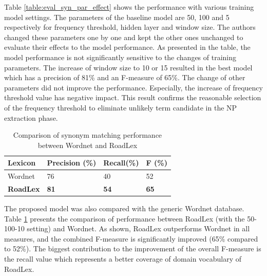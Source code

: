\documentclass[Journal,InsideFigs, DoubleSpace]{ascelike} %
\begin{document}
%
Table \ref{table:eval_syn_par_effect} shows the performance with various training model settings. The parameters of the baseline model are 50, 100 and 5 respectively for frequency threshold, hidden layer and window size. The authors changed these parameters one by one and kept the other ones unchanged to evaluate their effects to the model performance. As presented in the table, the model performance is not significantly sensitive to the changes of training parameters. The increase of window size to 10 or 15 resulted in the best model which has a precision of 81\% and an F-measure of 65\%. The change of other parameters did not improve the performance. Especially, the increase of frequency threshold value has negative impact. This result confirms the reasonable selection of the frequency threshold to eliminate unlikely term candidate in the NP extraction phase.
%
\begin{table} [b] 
	\caption{Comparison of synonym matching performance between Wordnet and RoadLex}
	\label{table:eval_syn_vs_Wordnet}
	\centering
	\small
	\renewcommand{\arraystretch}{1.25}
	\begin{tabular}{l l l l }
		\hline
		\hline
		\textbf{Lexicon} & \textbf{Precision (\%)}  & \textbf{Recall(\%)} & \textbf{F (\%)}\\
		\hline
		Wordnet	&76 	&40 	&52\\	
		\textbf{RoadLex} &\textbf{81}	&\textbf{54}		&\textbf{65}\\	
		\hline
		\hline
	\end{tabular}
	\normalsize
\end{table}
\par
The proposed model was also compared with the generic Wordnet database. Table \ref{table:eval_syn_vs_Wordnet} presents the comparison of performance between RoadLex (with the 50-100-10 setting) and Wordnet. As shown, RoadLex outperforms Wordnet in all measures, and the combined F-measure is significantly improved (65\% compared to 52\%). The biggest contribution to the improvement of the overall F-measure is the recall value which represents a better coverage of domain vocabulary of RoadLex. 
\end{document}

